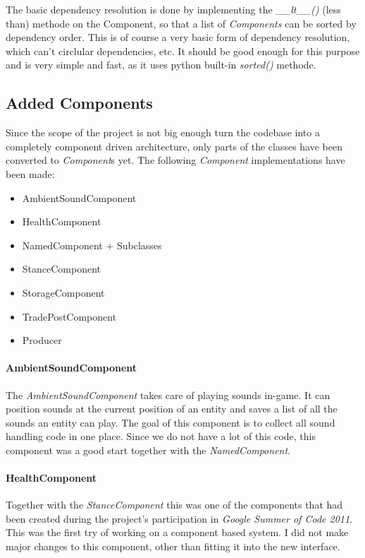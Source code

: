 The basic dependency resolution is done by implementing the \textit{\_\_lt\_\_()} (less than) methode on the Component,
so that a list of \textit{Components} can be sorted by dependency order. This is of course a very basic form of
dependency resolution, which can't circlular dependencies, etc. It should be good enough for this purpose and is very
simple and fast, as it uses python built-in \textit{sorted()} methode.


\subsection{Added Components}
Since the scope of the project is not big enough turn the \UH{} codebase into a completely component driven
architecture, only parts of the classes have been converted to \textit{Component}s yet. The following \textit{Component}
implementations have been made:
\begin{itemize}
    \item AmbientSoundComponent
    \item HealthComponent
    \item NamedComponent + Subclasses
    \item StanceComponent
    \item StorageComponent
    \item TradePostComponent
    \item Producer
\end{itemize}

\paragraph{AmbientSoundComponent}
The \textit{AmbientSoundComponent} takes care of playing sounds in-game. It can position sounds at the current position
of an entity and saves a list of all the sounds an entity can play. The goal of this component is to collect all sound
handling code in one place. Since we do not have a lot of this code, this component was a good start together with the
\textit{NamedComponent}.

\paragraph{HealthComponent}
Together with the \textit{StanceComponent} this was one of the components that had been created during the project's
participation in \textit{Google Summer of Code 2011}. This was the first try of working on a component based system. I
did not make major changes to this component, other than fitting it into the new interface.

